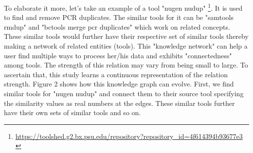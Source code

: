 To elaborate it more, let's take an example of a tool "nugen nudup" \footnote{\url{ https://toolshed.g2.bx.psu.edu/repository?repository_id=4f614394b93677e3 }}. It is used to find and remove PCR duplicates. The similar tools for it can be "samtools rmdup" and "bctools merge pcr duplicates" which work on related concepts. These similar tools would further have their respective set of similar tools thereby making a network of related entities (tools). This "knowledge network" can help a user find multiple ways to process her/his data and exhibits "connectedness" among tools. The strength of this relation may vary from being small to large. To ascertain that, this study learns a continuous representation of the relation strength. Figure 2 shows how this knowledge graph can evolve. First, we find similar tools for "nugen nudup" and connect them to their source tool specifying the similarity values as real numbers at the edges. These similar tools further have their own sets of similar tools and so on.

